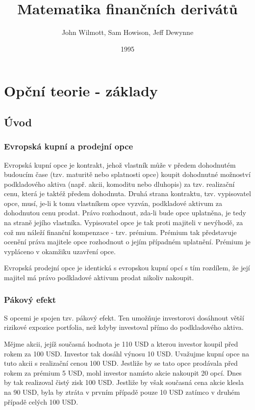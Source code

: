 \documentclass[a4paper]{book}
\begin{document}
\title{Matematika finančních derivátů}
\author{John Wilmott, Sam Howison, Jeff Dewynne}
\date{1995}
\maketitle

\tableofcontents

\part{Opční teorie - základy}

\chapter{Úvod}

\section{Evropská kupní a prodejní opce}

Evropská kupní opce je kontrakt, jehož vlastník může v předem dohodnutém budoucím čase (tzv. maturitě nebo splatnosti opce) koupit dohodnutné možnoství podkladového aktiva (např. akcii, komoditu nebo dluhopis) za tzv. realizační cenu, která je taktéž předem dohodnuta. Druhá strana kontraktu, tzv. vypisovatel opce, musí, je-li k tomu vlastníkem opce vyzván, podkladové aktivum za dohodnutou cenu prodat. Právo rozhodnout, zda-li bude opce uplatněna, je tedy na straně jejího vlastníka. Vypisovatel opce je tak proti majiteli v nevýhodě, za což mu náleží finanční kompenzace - tzv. prémium. Prémium tak představuje ocenění práva majitele opce rozhodnout o jejím případném uplatnění. Prémium je vypláceno v okamžiku uzavření opce.

Evropská prodejní opce je identická s evropskou kupní opcí s tím rozdílem, že její majitel má právo podkladové aktivum prodat nikoliv nakoupit.

\section{Pákový efekt}

S opcemi je spojen tzv. pákový efekt. Ten umožňuje investorovi dosáhnout větší rizikové expozice portfolia, než kdyby investoval přímo do podkladového aktiva.

Mějme akcii, jejíž současná hodnota je 110 USD a kterou investor koupil před rokem za 100 USD. Investor tak dosáhl výnosu 10 USD. Uvažujme kupní opce na tuto akcii s realizační cenou 100 USD. Jestliže by se tato opce prodávala před rokem za prémium 5 USD, mohl investor namísto akcie nakoupit 20 opcí. Dnes by tak realizoval čistý zisk 100 USD. Jestliže by však současná cena akcie klesla na 90 USD, byla by ztráta v prvním případě pouze 10 USD zatímco v druhém případě celých 100 USD.
\end{document}
